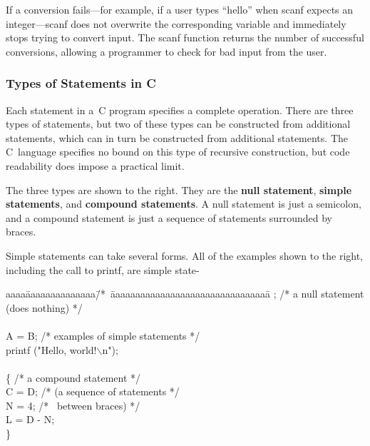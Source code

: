 If a conversion fails---for example, if a user types ``hello'' when
{\tfix scanf} expects an integer---{\tfix scanf} does not overwrite the
corresponding variable and immediately stops trying to convert input.
%
The {\tfix scanf} function returns the number of successful 
conversions, allowing a programmer to check for bad input from
the user.\\

\subsubsection{Types of Statements in C}

Each statement in a~C program specifies a complete operation.
%
There are three types of statements, but two of these types can
be constructed from additional statements, which can in turn be
constructed from additional statements.  The C~language specifies
no bound on this type of recursive construction, but code 
readability does impose a practical limit.

\begin{minipage}{2.65in}
The three types are shown to the right.
They are the {\bf null statement}, 
{\bf simple statements}, 
and {\bf compound statements}.
%
A null statement is just a semicolon, and a compound statement 
is just a sequence of statements surrounded by braces.\mpline

Simple statements can take several forms.  All of the examples
shown to the right, including the call to {\tfix printf}, are
simple state-\linebreak\mpdone
\end{minipage}\hspace{0.25in}%
\begin{minipage}{3.6in}
{\fix
\begin{tabbing}
aaaa\=aaaaaaaaaaaaaa\=/*~\=aaaaaaaaaaaaaaaaaaaaaaaaaaaaaaaa\=\kill
;   \> \> /* \>a null statement (does nothing) \>*/\\
\\
A = B; \> \> /*  \>examples of simple statements \>*/\\
printf ("Hello, world!$\backslash$n");\\
\\
\{    \> \> /* \> a compound statement \>*/ \\
\>  C = D; \> /* \> (a sequence of statements \>*/\\
\>  N = 4; \> /* \>~between braces) \>*/ \\
\>  L = D - N;\\
\}
\end{tabbing}
}
\end{minipage}\vspace{-2pt}

